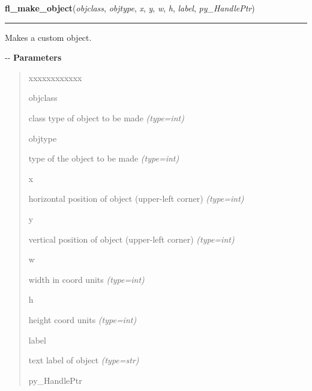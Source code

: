     \vspace{0.5ex}

\hspace{.8\funcindent}\begin{boxedminipage}{\funcwidth}

    \raggedright \textbf{fl\_make\_object}(\textit{objclass}, \textit{objtype}, \textit{x}, \textit{y}, \textit{w}, \textit{h}, \textit{label}, \textit{py\_HandlePtr})

    \vspace{-1.5ex}

    \rule{\textwidth}{0.5\fboxrule}
\setlength{\parskip}{2ex}

Makes a custom object.

-{}-
\setlength{\parskip}{1ex}
      \textbf{Parameters}
      \vspace{-1ex}

      \begin{quote}
        \begin{Ventry}{xxxxxxxxxxxx}

          \item[objclass]


class type of object to be made
            {\it (type=int)}

          \item[objtype]


type of the object to be made
            {\it (type=int)}

          \item[x]


horizontal position of object (upper-left corner)
            {\it (type=int)}

          \item[y]


vertical position of object (upper-left corner)
            {\it (type=int)}

          \item[w]


width in coord units
            {\it (type=int)}

          \item[h]


height coord units
            {\it (type=int)}

          \item[label]


text label of object
            {\it (type=str)}

          \item[py\_HandlePtr]



\end{Ventry}
\end{quote}
\end{boxedminipage}
